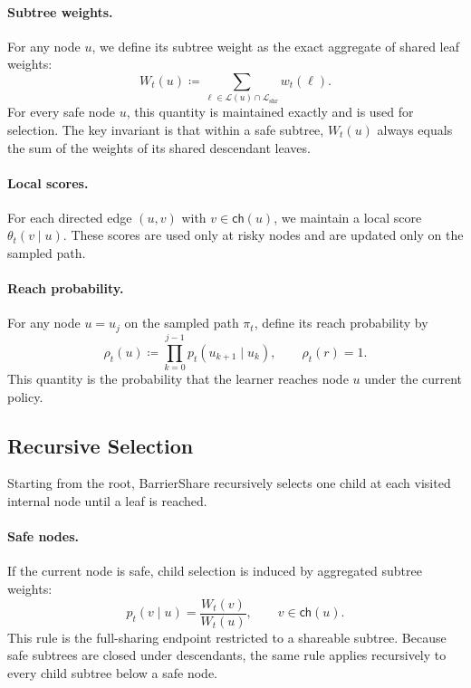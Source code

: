 \documentclass{article}
\begin{document}
\paragraph{Subtree weights.}
For any node $u$, we define its subtree weight as the exact aggregate of shared leaf weights:
\begin{equation}
    W_t(u) \coloneqq \sum_{\ell \in \mathcal{L}(u)\cap \mathcal{L}_{\mathrm{shr}}} w_t(\ell).
    \label{eq:subtree_weight_def}
\end{equation}
For every safe node $u$, this quantity is maintained exactly and is used for selection. The key invariant is that within a safe subtree, $W_t(u)$ always equals the sum of the weights of its shared descendant leaves.

\paragraph{Local scores.}
For each directed edge $(u,v)$ with $v \in \mathsf{ch}(u)$, we maintain a local score $\theta_t(v\mid u)$. These scores are used only at risky nodes and are updated only on the sampled path.

\paragraph{Reach probability.}
For any node $u=u_j$ on the sampled path $\pi_t$, define its reach probability by
\begin{equation}
    \rho_t(u) \coloneqq \prod_{k=0}^{j-1} p_t(u_{k+1}\mid u_k),
    \qquad \rho_t(r)=1.
    \label{eq:reach_prob}
\end{equation}
This quantity is the probability that the learner reaches node $u$ under the current policy.

\subsection{Recursive Selection}
\label{sec:barriershare_selection}

Starting from the root, BarrierShare recursively selects one child at each visited internal node until a leaf is reached.

\paragraph{Safe nodes.}
If the current node is safe, child selection is induced by aggregated subtree weights:
\begin{equation}
    p_t(v\mid u) = \frac{W_t(v)}{W_t(u)},
    \qquad v \in \mathsf{ch}(u).
    \label{eq:safe_selection}
\end{equation}
This rule is the full-sharing endpoint restricted to a shareable subtree. Because safe subtrees are closed under descendants, the same rule applies recursively to every child subtree below a safe node.
\end{document}
